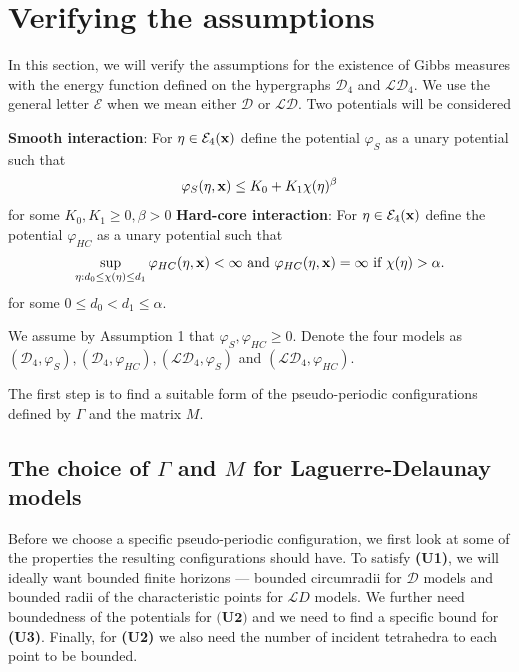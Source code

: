 \section{Verifying the assumptions}\label{sec:verifyassumptions}
In this section, we will verify the assumptions for the existence of Gibbs measures with the energy function defined on the hypergraphs $\mathcal D_4$ and $\mathcal {LD}_4$. We use the general letter $\mathcal E$ when we mean either $\mathcal D$ or $\mathcal {LD}$. Two potentials will be considered

\noindent \textbf{Smooth interaction}:  For $\eta\in\mathcal E_4({\mathbf{x}})$ define the potential $\varphi_S$ as a unary potential such that
$$\varphi_S(\eta,{\mathbf{x}}) \leq K_0 + K_1 \chi(\eta)^{\beta}$$
for some $K_0,K_1 \geq 0, \beta >0$\newline
\textbf{Hard-core interaction}: For $\eta\in\mathcal E_4({\mathbf{x}})$ define the potential $\varphi_{HC}$ as a unary potential such that
$$\sup_{\eta: d_0 \leq \chi(\eta) \leq d_1} \varphi_{HC}(\eta,{\mathbf{x}})  < \infty \text{ and } \varphi_{HC}(\eta,{\mathbf{x}})=\infty \text{ if } \chi(\eta)>\alpha.$$ 
for some $0\leq d_0 < d_1 \leq \alpha$. 

\noindent We assume by Assumption 1 that $\varphi_S,\varphi_{HC}\geq 0$. Denote the four models as $(\mathcal D_4,\varphi_{S}),(\mathcal D_4,\varphi_{HC}),(\mathcal {LD}_4,\varphi_{S})$ and $(\mathcal {LD}_4, \varphi_{HC})$. \newline

The first step is to find a suitable form of the pseudo-periodic configurations defined by $\Gamma$ and the matrix $M$. 

\subsection{The choice of $\Gamma$ and $M$ for Laguerre-Delaunay models}\label{sec:MGamma}
Before we choose a specific pseudo-periodic configuration, we first look at some of the properties the resulting configurations should have. To satisfy \textbf{(U1)}, we will ideally want bounded finite horizons --- bounded circumradii for $\mathcal D$ models and bounded radii of the characteristic points for $\mathcal LD$ models. We further need boundedness of the potentials for $\textbf{(U2)}$ and we need to find a specific bound for \textbf{(U3)}. Finally, for \textbf{(U2)} we also need the number of incident tetrahedra to each point to be bounded.

